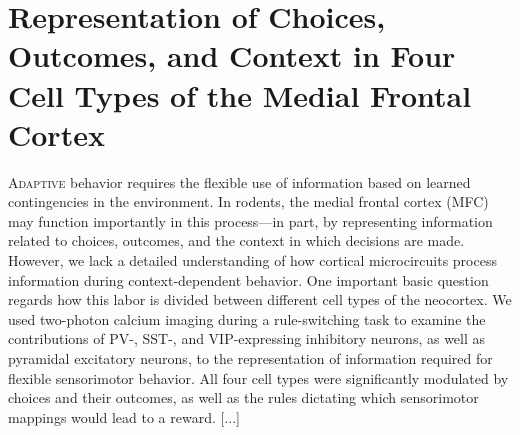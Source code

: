 \chapter{Representation of Choices, Outcomes, and Context in Four Cell Types of the Medial Frontal Cortex}


\lettrine[lines=3,slope=4pt,findent=-4pt]{A}{daptive} behavior requires the flexible use of information based on learned contingencies in the environment. In rodents, the medial frontal cortex (MFC) may function importantly in this process---in part, by representing information related to choices, outcomes, and the context in which decisions are made. However, we lack a detailed understanding of how cortical microcircuits process information during context-dependent behavior. One important basic question regards how this labor is divided between different cell types of the neocortex. We used two-photon calcium imaging during a rule-switching task to examine the contributions of PV-, SST-, and VIP-expressing inhibitory neurons, as well as pyramidal excitatory neurons, to the representation of information required for flexible sensorimotor behavior. All four cell types were significantly modulated by choices and their outcomes, as well as the rules dictating which sensorimotor mappings would lead to a reward. [...]

\newpage


\newpage


\newpage








